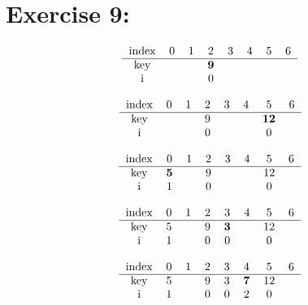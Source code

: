\documentclass{article}
\begin{document}
\section*{Exercise 9:}
\begin{center}

\[
\begin{tabular}{cccccccc}
 index & 0 & 1 & 2 & 3 & 4 & 5 & 6 \\[0pt]
\hline key &  &  & $\mathbf{9}$ &  &  &  &  \\[0pt]
 i &  &  & 0 &  &  &  &  \\[0pt]
\end{tabular}
\]

\[
\begin{tabular}{cccccccc}
 index & 0 & 1 & 2 & 3 & 4 & 5 & 6 \\[0pt]
\hline key &  &  & 9 &  &  & $\mathbf{12}$ &  \\[0pt]
 i &  &  & 0 &  &  & 0 &  \\[0pt]
\end{tabular}
\]

\[
\begin{tabular}{cccccccc}
 index & 0 & 1 & 2 & 3 & 4 & 5 & 6 \\[0pt]
\hline key & $\mathbf{5}$ &  & 9 &  &  & 12 &  \\[0pt]
 i & 1 &  & 0 &  &  & 0 &  \\[0pt]
\end{tabular}
\]

\[
\begin{tabular}{cccccccc}
 index & 0 & 1 & 2 & 3 & 4 & 5 & 6 \\[0pt]
\hline key & 5 &  & 9 & $\mathbf{3}$ &  & 12 &  \\[0pt]
 i & 1 &  & 0 & 0 &  & 0 &  \\[0pt]
\end{tabular}
\]

\[
\begin{tabular}{cccccccc}
 index & 0 & 1 & 2 & 3 & 4 & 5 & 6 \\[0pt]
\hline key & 5 &  & 9 & 3 & $\mathbf{7}$ & 12 &  \\[0pt]
 i & 1 &  & 0 & 0 & 2 & 0 &  \\[0pt]
\end{tabular}
\]
\end{center}
\end{document}
